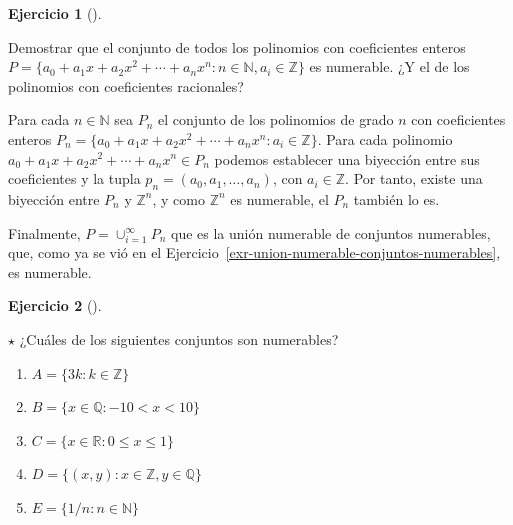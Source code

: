 \documentclass[
  a4paper,
]{scrreport}
\providecommand{\tightlist}{%
  \setlength{\itemsep}{0pt}\setlength{\parskip}{0pt}}\usepackage{longtable,booktabs,array}
\theoremstyle{definition}
\newtheorem{exercise}{Ejercicio}[chapter]
\theoremstyle{remark}
\begin{document}
\leavevmode{}%
\begin{exercise}[]\label{exr-conjunto-polinomios-no-numerable}

Demostrar que el conjunto de todos los polinomios con coeficientes
enteros
\(P=\{a_0+a_1x+a_2x^2+\cdots+a_nx^n: n\in \mathbb{N}, a_i\in \mathbb{Z}\}\)
es numerable. ¿Y el de los polinomios con coeficientes racionales?

\end{exercise}

\begin{tcolorbox}[enhanced jigsaw, left=2mm, arc=.35mm, coltitle=black, toprule=.15mm, colback=white, breakable, bottomrule=.15mm, colbacktitle=quarto-callout-tip-color!10!white, bottomtitle=1mm, toptitle=1mm, opacityback=0, titlerule=0mm, opacitybacktitle=0.6, title=\textcolor{quarto-callout-tip-color}{\faLightbulb}\hspace{0.5em}{Solución}, rightrule=.15mm, leftrule=.75mm, colframe=quarto-callout-tip-color-frame]

Para cada \(n\in\mathbb{N}\) sea \(P_n\) el conjunto de los polinomios
de grado \(n\) con coeficientes enteros
\(P_n=\{a_0+a_1x+a_2x^2+\cdots+a_nx^n: a_i\in \mathbb{Z}\}\). Para cada
polinomio \(a_0+a_1x+a_2x^2+\cdots+a_nx^n\in P_n\) podemos establecer
una biyección entre sus coeficientes y la tupla
\(p_n=(a_0,a_1,\ldots,a_n)\), con \(a_i\in\mathbb{Z}\). Por tanto,
existe una biyección entre \(P_n\) y \(\mathbb{Z}^n\), y como
\(\mathbb{Z}^n\) es numerable, el \(P_n\) también lo es.

Finalmente, \(P=\cup_{i=1}^\infty P_n\) que es la unión numerable de
conjuntos numerables, que, como ya se vió en el
Ejercicio~\ref{exr-union-numerable-conjuntos-numerables}, es numerable.

\end{tcolorbox}

\leavevmode{}%
\begin{exercise}[]\label{exr-conjuntos-numerables}

\(\star\) ¿Cuáles de los siguientes conjuntos son numerables?

\begin{enumerate}
\def\labelenumi{\alph{enumi}.}
\tightlist
\item
  \(A=\{3k: k\in \mathbb{Z}\}\)
\item
  \(B=\{x\in \mathbb{Q}: -10 < x < 10\}\)
\item
  \(C = \{x\in \mathbb{R}: 0\leq x\leq 1\}\)
\item
  \(D=\{(x,y): x\in \mathbb{Z}, y\in \mathbb{Q}\}\)
\item
  \(E=\{1/n : n\in \mathbb{N}\}\)
\end{enumerate}

\end{exercise}
\end{document}
